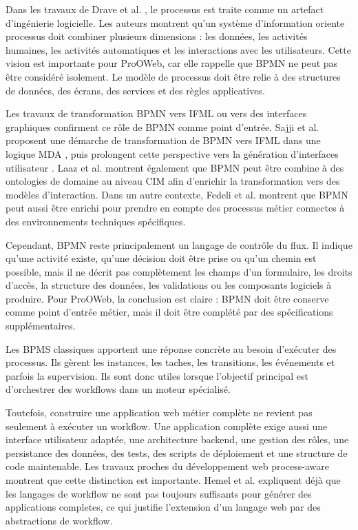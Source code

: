 Dans les travaux de Drave et al. \cite{drave2022}, le processus est traite comme un artefact d’ingénierie logicielle. Les auteurs montrent qu'un système d'information oriente processus doit combiner plusieurs dimensions : les données, les activités humaines, les activités automatiques et les interactions avec les utilisateurs. Cette vision est importante pour ProOWeb, car elle rappelle que BPMN ne peut pas être considéré isolement. Le modèle de processus doit être relie à des structures de données, des écrans, des services et des règles applicatives.

Les travaux de transformation BPMN vers IFML ou vers des interfaces graphiques confirment ce rôle de BPMN comme point d'entrée. Sajji et al. proposent une démarche de transformation de BPMN vers IFML dans une logique MDA \cite{sajji2022}, puis prolongent cette perspective vers la génération d'interfaces utilisateur \cite{sajji2023}. Laaz et al. \cite{laaz2020} montrent également que BPMN peut être combine à des ontologies de domaine au niveau CIM afin d'enrichir la transformation vers des modèles d'interaction. Dans un autre contexte, Fedeli et al. \cite{fedeli2024} montrent que BPMN peut aussi être enrichi pour prendre en compte des processus métier connectes à des environnements techniques spécifiques.

Cependant, BPMN reste principalement un langage de contrôle du flux. Il indique qu'une activité existe, qu'une décision doit être prise ou qu'un chemin est possible, mais il ne décrit pas complètement les champs d'un formulaire, les droits d’accès, la structure des données, les validations ou les composants logiciels à produire. Pour ProOWeb, la conclusion est claire : BPMN doit être conserve comme point d’entrée métier, mais il doit être complété par des spécifications supplémentaires.


Les BPMS classiques apportent une réponse concrète au besoin d’exécuter des processus. Ils gèrent les instances, les taches, les transitions, les événements et parfois la supervision. Ils sont donc utiles lorsque l'objectif principal est d'orchestrer des workflows dans un moteur spécialisé.

Toutefois, construire une application web métier complète ne revient pas seulement à exécuter un workflow. Une application complète exige aussi une interface utilisateur adaptée, une architecture backend, une gestion des rôles, une persistance des données, des tests, des scripts de déploiement et une structure de code maintenable. Les travaux proches du développement web process-aware montrent que cette distinction est importante. Hemel et al. \cite{hemel2008} expliquent déjà que les langages de workflow ne sont pas toujours suffisants pour générer des applications completes, ce qui justifie l'extension d'un langage web par des abstractions de workflow.

